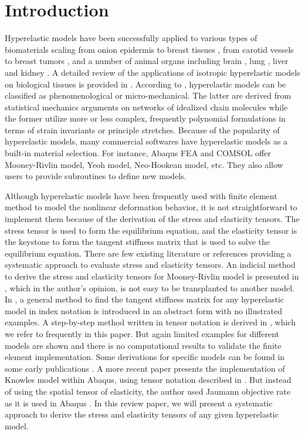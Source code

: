 \section{Introduction}
Hyperelastic models have been successfully applied to various types of biomaterials scaling from onion epidermis \cite{Qian} to breast tissues \cite{OHagen}, from carotid vessels \cite{Zidi, Zidi2, Bols} to breast tumors \cite{Oberai}, and a number of animal organs including brain \cite{Karimi, Samani, Gilchrist}, lung  \cite{Wall, Wall2}, liver and kidney \cite{Fu, Untaroiu, Willinger}. A detailed review of the applications of isotropic hyperelastic models on biological tissues is provided in \cite{Kupriyanova}.
According to \cite{Steinmann}, hyperelastic models can be classified as phenomenological or micro-mechanical. The latter are derived from statistical mechanics arguments on networks of idealized chain molecules while the former utilize more or less complex, frequently polynomial formulations in terms of strain invariants or principle stretches. Because of the popularity of hyperelastic models, many commercial softwares have hyperelastic models as a built-in material selection. For instance, Abaqus FEA and COMSOL offer Mooney-Rivlin model, Yeoh model, Neo-Hookean model, etc. They also allow users to provide subroutines to define new models.

Although hyperelastic models have been frequently used with finite element method to model the nonlinear deformation behavior, it is not straightforward to implement them because of the derivation of the stress and elasticity tensors. The stress tensor is used to form the equilibrium equation, and the elasticity tensor is the keystone to form the tangent stiffness matrix that is used to solve the equilibrium equation. There are few existing literature or references providing a systematic approach to evaluate stress and elasticity tensors. An indicial method to derive the stress and elasticity tensors for Mooney-Rivlin model is presented in \cite{Bower}, which in the author's opinion, is not easy to be transplanted to another model. In \cite{Belytschko}, a general method to find the tangent stiffness matrix for any hyperelastic model in index notation is introduced in an abstract form with no illustrated examples. A step-by-step method written in tensor notation is derived in \cite{Holzapfel}, which we refer to frequently in this paper. But again limited examples for different models are shown and there is no computational results to validate the finite element implementation. Some derivations for specific models can be found in some early publications \cite{Weiss, Nicholson}. A more recent paper \cite{Suchocki} presents the implementation of Knowles model within Abaqus, using tensor notation described in \cite{Holzapfel}. But instead of using the spatial tensor of elasticity, the author used Jaumann objective rate as it is used in Abaqus \cite{Abaqus}. In this review paper, we will present a systematic approach to derive the stress and elasticity tensors of any given hyperelastic model.

